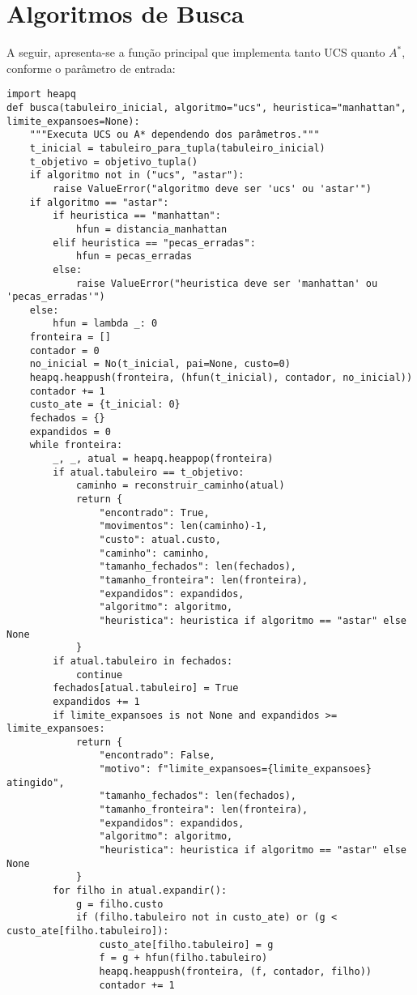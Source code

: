 \section{Algoritmos de Busca}  
A seguir, apresenta-se a função principal que implementa tanto UCS quanto $A^*$, conforme o parâmetro de entrada:  
\begin{verbatim}  
import heapq  
def busca(tabuleiro_inicial, algoritmo="ucs", heuristica="manhattan", limite_expansoes=None):  
    """Executa UCS ou A* dependendo dos parâmetros."""  
    t_inicial = tabuleiro_para_tupla(tabuleiro_inicial)  
    t_objetivo = objetivo_tupla()  
    if algoritmo not in ("ucs", "astar"):  
        raise ValueError("algoritmo deve ser 'ucs' ou 'astar'")  
    if algoritmo == "astar":  
        if heuristica == "manhattan":  
            hfun = distancia_manhattan  
        elif heuristica == "pecas_erradas":  
            hfun = pecas_erradas  
        else:  
            raise ValueError("heuristica deve ser 'manhattan' ou 'pecas_erradas'")  
    else:  
        hfun = lambda _: 0  
    fronteira = []  
    contador = 0  
    no_inicial = No(t_inicial, pai=None, custo=0)  
    heapq.heappush(fronteira, (hfun(t_inicial), contador, no_inicial))  
    contador += 1  
    custo_ate = {t_inicial: 0}  
    fechados = {}  
    expandidos = 0  
    while fronteira:  
        _, _, atual = heapq.heappop(fronteira)  
        if atual.tabuleiro == t_objetivo:  
            caminho = reconstruir_caminho(atual)  
            return {  
                "encontrado": True,  
                "movimentos": len(caminho)-1,  
                "custo": atual.custo,  
                "caminho": caminho,  
                "tamanho_fechados": len(fechados),  
                "tamanho_fronteira": len(fronteira),  
                "expandidos": expandidos,  
                "algoritmo": algoritmo,  
                "heuristica": heuristica if algoritmo == "astar" else None  
            }  
        if atual.tabuleiro in fechados:  
            continue  
        fechados[atual.tabuleiro] = True  
        expandidos += 1  
        if limite_expansoes is not None and expandidos >= limite_expansoes:  
            return {  
                "encontrado": False,  
                "motivo": f"limite_expansoes={limite_expansoes} atingido",  
                "tamanho_fechados": len(fechados),  
                "tamanho_fronteira": len(fronteira),  
                "expandidos": expandidos,  
                "algoritmo": algoritmo,  
                "heuristica": heuristica if algoritmo == "astar" else None  
            }  
        for filho in atual.expandir():  
            g = filho.custo  
            if (filho.tabuleiro not in custo_ate) or (g < custo_ate[filho.tabuleiro]):  
                custo_ate[filho.tabuleiro] = g  
                f = g + hfun(filho.tabuleiro)  
                heapq.heappush(fronteira, (f, contador, filho))  
                contador += 1  
\end{verbatim}  
  

